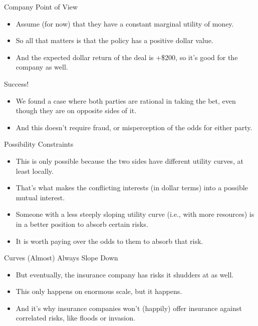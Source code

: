 \documentclass[
  ignorenonframetext,
]{beamer}
\providecommand{\tightlist}{%
  \setlength{\itemsep}{0pt}\setlength{\parskip}{0pt}}
\renewcommand{\,}{\text{, }}
\begin{document}
\begin{frame}{Company Point of View}
\protect\hypertarget{company-point-of-view}{}
\begin{itemize}
\tightlist
\item
  Assume (for now) that they have a constant marginal utility of money.
\item
  So all that matters is that the policy has a positive dollar value.
\item
  And the expected dollar return of the deal is +\$200, so it's good for
  the company as well.
\end{itemize}
\end{frame}

\begin{frame}{Success!}
\protect\hypertarget{success}{}
\begin{itemize}
\tightlist
\item
  We found a case where both parties are rational in taking the bet,
  even though they are on opposite sides of it.
\item
  And this doesn't require fraud, or misperception of the odds for
  either party.
\end{itemize}
\end{frame}

\begin{frame}{Possibility Constraints}
\protect\hypertarget{possibility-constraints}{}
\begin{itemize}
\tightlist
\item
  This is only possible because the two sides have different utility
  curves, at least locally.
\item
  That's what makes the conflicting interests (in dollar terms) into a
  possible mutual interest.
\item
  Someone with a less steeply sloping utility curve (i.e., with more
  resources) is in a better position to absorb certain risks.
\item
  It is worth paying over the odds to them to absorb that risk.
\end{itemize}
\end{frame}

\begin{frame}{Curves (Almost) Always Slope Down}
\protect\hypertarget{curves-almost-always-slope-down}{}
\begin{itemize}
\tightlist
\item
  But eventually, the insurance company has risks it shudders at as
  well.
\item
  This only happens on enormous scale, but it happens.
\item
  And it's why insurance companies won't (happily) offer insurance
  against correlated risks, like floods or invasion.
\end{itemize}
\end{frame}
\end{document}
